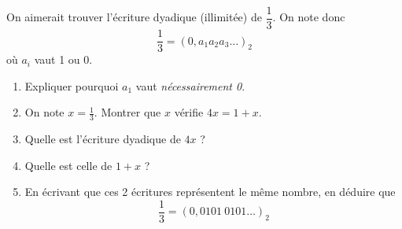 \documentclass[a4paper,12pt,french]{book}
\begin{document}
\begin{exercice}[**]
	On aimerait trouver l'écriture dyadique (illimitée) de $\dfrac{1}{3}$.
	On note donc $$\dfrac{1}{3}=(0,a_1a_2a_3\ldots)_2$$
	où $a_i$ vaut 1 ou 0.
	\begin{enumerate}[\bfseries 1.]
		\item 	Expliquer pourquoi $a_1$ vaut \textit{nécessairement 0}.
		\item 	On note $x=\frac{1}{3}$. Montrer que $x$ vérifie $4x=1+x$.
		\item 	Quelle est l'écriture dyadique de $4x$ ?
		\item 	Quelle est celle de $1+x$ ?
		\item 	En écrivant que ces 2 écritures représentent le même nombre, en déduire que $$\dfrac{1}{3}=(0,0101\ 0101\ldots )_2$$
	\end{enumerate}
\end{exercice}
\end{document}
